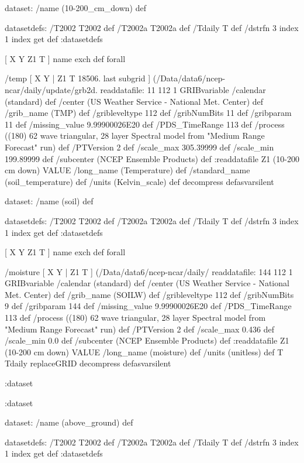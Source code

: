 \begin{ingrid}

 dataset: /name (10-200_cm_down) def

  datasetdefs:
  /T2002 T2002 def
  /T2002a T2002a def
  /Tdaily T def
  /dstrfn 3 index 1 index get def
  :datasetdefs

  [ X Y Z1 T ] { name exch def } forall

   /temp { [ X Y | Z1 T 18506. last subgrid ] (/Data/data6/ncep-ncar/daily/update/grb2d.%
   readdatafile:
   11 112 1 GRIBvariable
   /calendar (standard) def
   /center (US Weather Service - National Met. Center) def
   /grib_name (TMP) def
   /gribleveltype 112 def
   /gribNumBits 11 def
   /gribparam 11 def
   /missing_value 9.99900026E20 def
   /PDS_TimeRange 113 def
   /process ((180) 62 wave triangular, 28 layer Spectral model from "Medium Range Forecast" run) def
   /PTVersion 2 def
   /scale_max 305.39999 def
   /scale_min 199.89999 def
   /subcenter (NCEP Ensemble Products) def
   :readdatafile
   Z1 (10-200 cm down) VALUE
   /long_name (Temperature) def
   /standard_name (soil_temperature) def
   /units (Kelvin_scale) def
   decompress
   } defasvarsilent

  dataset: /name (soil) def

   datasetdefs:
   /T2002 T2002 def
   /T2002a T2002a def
   /Tdaily T def
   /dstrfn 3 index 1 index get def
   :datasetdefs

   [ X Y Z1 T ] { name exch def } forall

   /moisture { [ X Y | Z1 T ] (/Data/data6/ncep-ncar/daily/%
   readdatafile:
   144 112 1 GRIBvariable
   /calendar (standard) def
   /center (US Weather Service - National Met. Center) def
   /grib_name (SOILW) def
   /gribleveltype 112 def
   /gribNumBits 9 def
   /gribparam 144 def
   /missing_value 9.99900026E20 def 
   /PDS_TimeRange 113 def
   /process ((180) 62 wave triangular, 28 layer Spectral model from "Medium Range Forecast" run) def
   /PTVersion 2 def
   /scale_max 0.436 def
   /scale_min 0.0 def
   /subcenter (NCEP Ensemble Products) def
   :readdatafile
   Z1 (10-200 cm down) VALUE
   /long_name (moisture) def
   /units (unitless) def
   T Tdaily replaceGRID 
   decompress
   } defasvarsilent

  :dataset

 :dataset

 dataset: /name (above_ground) def

  datasetdefs:
  /T2002 T2002 def
  /T2002a T2002a def
  /Tdaily T def
  /dstrfn 3 index 1 index get def
  :datasetdefs


\end{ingrid}
